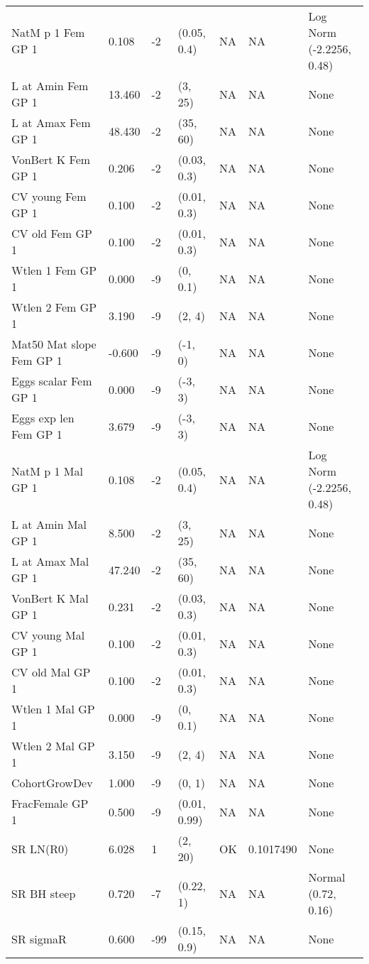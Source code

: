 \documentclass[11pt,
  english,
  a4paper,
]{article}
\begin{document}
\begin{landscape}
\begin{longtable}[t]{>{\raggedright\arraybackslash}p{8.5cm}lllll>{\raggedright\arraybackslash}p{4cm}}
\endfoot
\bottomrule
\endlastfoot
NatM p 1 Fem GP 1 & 0.108 & -2 & (0.05, 0.4) & NA & NA & Log Norm (-2.2256, 0.48)\\
L at Amin Fem GP 1 & 13.460 & -2 & (3, 25) & NA & NA & None\\
L at Amax Fem GP 1 & 48.430 & -2 & (35, 60) & NA & NA & None\\
VonBert K Fem GP 1 & 0.206 & -2 & (0.03, 0.3) & NA & NA & None\\
CV young Fem GP 1 & 0.100 & -2 & (0.01, 0.3) & NA & NA & None\\
CV old Fem GP 1 & 0.100 & -2 & (0.01, 0.3) & NA & NA & None\\
Wtlen 1 Fem GP 1 & 0.000 & -9 & (0, 0.1) & NA & NA & None\\
Wtlen 2 Fem GP 1 & 3.190 & -9 & (2, 4) & NA & NA & None\\
Mat50%
Mat slope Fem GP 1 & -0.600 & -9 & (-1, 0) & NA & NA & None\\
Eggs scalar Fem GP 1 & 0.000 & -9 & (-3, 3) & NA & NA & None\\
Eggs exp len Fem GP 1 & 3.679 & -9 & (-3, 3) & NA & NA & None\\
NatM p 1 Mal GP 1 & 0.108 & -2 & (0.05, 0.4) & NA & NA & Log Norm (-2.2256, 0.48)\\
L at Amin Mal GP 1 & 8.500 & -2 & (3, 25) & NA & NA & None\\
L at Amax Mal GP 1 & 47.240 & -2 & (35, 60) & NA & NA & None\\
VonBert K Mal GP 1 & 0.231 & -2 & (0.03, 0.3) & NA & NA & None\\
CV young Mal GP 1 & 0.100 & -2 & (0.01, 0.3) & NA & NA & None\\
CV old Mal GP 1 & 0.100 & -2 & (0.01, 0.3) & NA & NA & None\\
Wtlen 1 Mal GP 1 & 0.000 & -9 & (0, 0.1) & NA & NA & None\\
Wtlen 2 Mal GP 1 & 3.150 & -9 & (2, 4) & NA & NA & None\\
CohortGrowDev & 1.000 & -9 & (0, 1) & NA & NA & None\\
FracFemale GP 1 & 0.500 & -9 & (0.01, 0.99) & NA & NA & None\\
SR LN(R0) & 6.028 & 1 & (2, 20) & OK & 0.1017490 & None\\
SR BH steep & 0.720 & -7 & (0.22, 1) & NA & NA & Normal (0.72, 0.16)\\
SR sigmaR & 0.600 & -99 & (0.15, 0.9) & NA & NA & None\\

\end{longtable}
\end{landscape}
\end{document}
